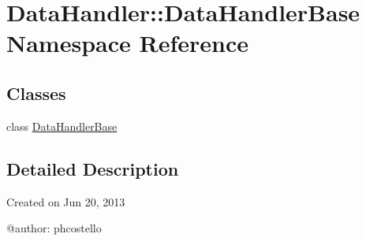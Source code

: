 \hypertarget{namespaceDataHandler_1_1DataHandlerBase}{\section{\-Data\-Handler\-:\-:\-Data\-Handler\-Base \-Namespace \-Reference}
\label{namespaceDataHandler_1_1DataHandlerBase}
}
\subsection*{\-Classes}
\begin{DoxyCompactItemize}
\item 
class \hyperlink{classDataHandler_1_1DataHandlerBase_1_1DataHandlerBase}{\-Data\-Handler\-Base}
\end{DoxyCompactItemize}


\subsection{\-Detailed \-Description}
\begin{DoxyVerb}
Created on Jun 20, 2013

@author: phcostello
\end{DoxyVerb}
 